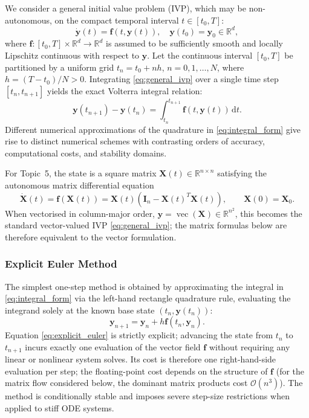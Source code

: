\documentclass[11pt,a4paper]{article}
\theoremstyle{definition}
\theoremstyle{remark}
\begin{document}
We consider a general initial value problem (IVP), which may be non-autonomous, on the compact temporal interval $t \in [t_0, T]$:
\begin{equation}
\label{eq:general_ivp}
\dot{\mathbf{y}}(t) = \mathbf{f}(t, \mathbf{y}(t)), \quad \mathbf{y}(t_0) = \mathbf{y}_0 \in \mathbb{R}^d,
\end{equation}
where $\mathbf{f}: [t_0, T] \times \mathbb{R}^d \to \mathbb{R}^d$ is assumed to be sufficiently smooth and locally Lipschitz continuous with respect to $\mathbf{y}$. Let the continuous interval $[t_0, T]$ be partitioned by a uniform grid
$t_n=t_0+nh$, $n=0,1,\ldots,N$, where $h=(T-t_0)/N>0$. Integrating \eqref{eq:general_ivp} over a single time step $[t_n,t_{n+1}]$ yields the exact Volterra integral relation:
\begin{equation}
\label{eq:integral_form}
\mathbf{y}(t_{n+1}) - \mathbf{y}(t_n) = \int_{t_n}^{t_{n+1}} \mathbf{f}(t, \mathbf{y}(t)) \, \mathrm{d}t.
\end{equation}
Different numerical approximations of the quadrature in \eqref{eq:integral_form} give rise to distinct numerical schemes with contrasting orders of accuracy, computational costs, and stability domains.

For Topic~5, the state is a square matrix
$\mathbf{X}(t)\in\mathbb{R}^{n\times n}$ satisfying the autonomous
matrix differential equation
\begin{equation}
\label{eq:topic5_matrix_model}
\dot{\mathbf{X}}(t)
=
\mathbf{f}(\mathbf{X}(t))
=
\mathbf{X}(t)\left(\mathbf{I}_n-\mathbf{X}(t)^T\mathbf{X}(t)\right),
\qquad
\mathbf{X}(0)=\mathbf{X}_0.
\end{equation}
When vectorised in column-major order,
$\mathbf{y}=\operatorname{vec}(\mathbf{X})\in\mathbb{R}^{n^2}$,
this becomes the standard vector-valued IVP \eqref{eq:general_ivp}; the
matrix formulas below are therefore equivalent to the vector formulation.

\subsubsection{Explicit Euler Method}
The simplest one-step method is obtained by approximating the integral in \eqref{eq:integral_form} via the left-hand rectangle quadrature rule, evaluating the integrand solely at the known base state $(t_n, \mathbf{y}(t_n))$:
\begin{equation}
\label{eq:explicit_euler}
\mathbf{y}_{n+1} = \mathbf{y}_n + h \mathbf{f}(t_n, \mathbf{y}_n).
\end{equation}
Equation \eqref{eq:explicit_euler} is strictly explicit; advancing the state from $t_n$ to $t_{n+1}$ incurs exactly one evaluation of the vector field $\mathbf{f}$ without requiring any linear or nonlinear system solves. Its cost is therefore one right-hand-side evaluation per step; the floating-point cost depends on the structure of $\mathbf{f}$ (for the matrix flow considered below, the dominant matrix products cost $\mathcal{O}(n^3)$). The method is conditionally stable and imposes severe step-size restrictions when applied to stiff ODE systems.
\end{document}
